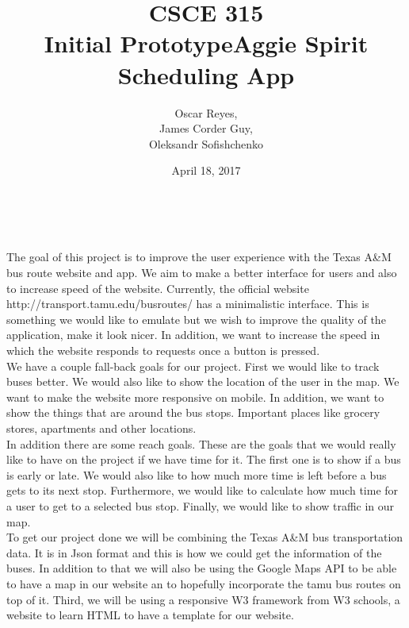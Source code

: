 \documentclass[12pt]{report}
\title{CSCE 315 \\ Initial Prototype}
\author{Oscar Reyes,\\
	James Corder Guy,\\
	Oleksandr Sofishchenko}
\date{April 18, 2017}
\begin{document}
	
	\maketitle
	
	\newpage
	
	\begin{center}
		\title{\textbf{Aggie Spirit Scheduling App}} \\
		
	\end{center}

	The goal of this project is to improve the user experience with the Texas A\&M bus route website and app. We aim to make a better interface for users and also to increase speed of the website. Currently, the official website http://transport.tamu.edu/busroutes/ has a minimalistic interface. This is something we would like to emulate but we wish to improve the quality of the application, make it look nicer. In addition, we want to increase the speed in which the website responds to requests once a button is pressed. \\
	
	We have a couple fall-back goals for our project. First we would like to track buses better. We would also like to show the location of the user in the map. We want to make the website more responsive on mobile. In addition, we want to show the things that are around the bus stops. Important places like grocery stores, apartments and other locations.\\
	
	In addition there are some reach goals. These are the goals that we would really like to have on the project if we have time for it. The first one is to show if a bus is early or late. We would also like to how much more time is left before a bus gets to its next stop. Furthermore, we would like to calculate how much time for a user to get to a selected bus stop. Finally, we would like to show traffic in our map.\\
	
	To get our project done we will be combining the Texas A\&M bus transportation data. It is in Json format and this is how we could get the information of the buses. In addition to that we will also be using the Google Maps API to be able to have a map in our website an to hopefully incorporate the tamu bus routes on top of it. Third, we will be using a responsive W3 framework from W3 schools, a website to learn HTML to have a template for our website.\\
	
\end{document}
